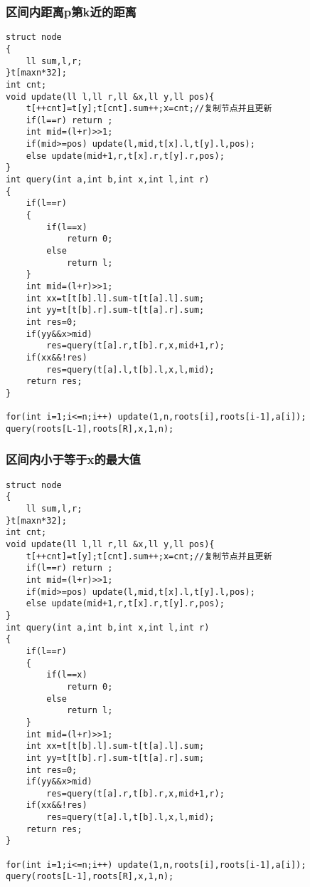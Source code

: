 \documentclass[twocolumn,a4]{article}
\begin{document}
\subsubsection{区间内距离p第k近的距离}
\begin{lstlisting}
struct node
{
	ll sum,l,r;
}t[maxn*32];
int cnt;
void update(ll l,ll r,ll &x,ll y,ll pos){
	t[++cnt]=t[y];t[cnt].sum++;x=cnt;//复制节点并且更新
	if(l==r) return ;
	int mid=(l+r)>>1;
	if(mid>=pos) update(l,mid,t[x].l,t[y].l,pos);
	else update(mid+1,r,t[x].r,t[y].r,pos);
}
int query(int a,int b,int x,int l,int r)
{
	if(l==r)
	{
		if(l==x)
			return 0;
		else
			return l;
	}
	int mid=(l+r)>>1;
	int xx=t[t[b].l].sum-t[t[a].l].sum;
	int yy=t[t[b].r].sum-t[t[a].r].sum;
	int res=0;
	if(yy&&x>mid)
		res=query(t[a].r,t[b].r,x,mid+1,r);
	if(xx&&!res)
		res=query(t[a].l,t[b].l,x,l,mid);
	return res;
}

for(int i=1;i<=n;i++) update(1,n,roots[i],roots[i-1],a[i]);
query(roots[L-1],roots[R],x,1,n);
\end{lstlisting}

\subsubsection{区间内小于等于x的最大值}
\begin{lstlisting}
struct node
{
	ll sum,l,r;
}t[maxn*32];
int cnt;
void update(ll l,ll r,ll &x,ll y,ll pos){
	t[++cnt]=t[y];t[cnt].sum++;x=cnt;//复制节点并且更新
	if(l==r) return ;
	int mid=(l+r)>>1;
	if(mid>=pos) update(l,mid,t[x].l,t[y].l,pos);
	else update(mid+1,r,t[x].r,t[y].r,pos);
}
int query(int a,int b,int x,int l,int r)
{
	if(l==r)
	{
		if(l==x)
			return 0;
		else
			return l;
	}
	int mid=(l+r)>>1;
	int xx=t[t[b].l].sum-t[t[a].l].sum;
	int yy=t[t[b].r].sum-t[t[a].r].sum;
	int res=0;
	if(yy&&x>mid)
		res=query(t[a].r,t[b].r,x,mid+1,r);
	if(xx&&!res)
		res=query(t[a].l,t[b].l,x,l,mid);
	return res;
}

for(int i=1;i<=n;i++) update(1,n,roots[i],roots[i-1],a[i]);
query(roots[L-1],roots[R],x,1,n);
\end{lstlisting}
\end{document}

